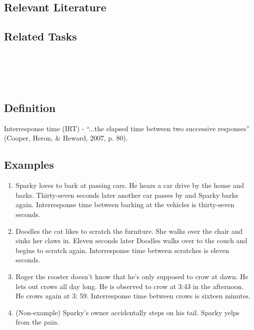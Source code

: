 \subsection{Relevant Literature}
\begin{refsection}
\nocite{cooper2007applied,thomason2011response}
\printbibliography[heading=none]
\end{refsection}

\subsection{Related Tasks}
\fourhOne{}\\
\fouriOne{}\\
\fourFKFourtySeven{}\\
%
\clearpage \section{\fouraFive{}}
\subsection{Definition}  
Interresponse time (IRT) - ``...the elapsed time between two successive responses'' (Cooper, Heron, \& Heward, 2007, p. 80).
%  
\subsection{Examples} 
\begin{enumerate}
\item Sparky loves to bark at passing cars.  He hears a car drive by the house and barks.  Thirty-seven seconds later another car passes by and Sparky barks again.  Interresponse time between barking at the vehicles is thirty-seven seconds.
\item Doodles the cat likes to scratch the furniture.  She walks over the chair and sinks her claws in.  Eleven seconds later Doodles walks over to the couch and begins to scratch again.  Interresponse time between scratches is eleven seconds.  
\item Roger the rooster doesn't know that he's only supposed to crow at dawn. He lets out crows all day long.  He is observed to crow at 3:43 in the afternoon.  He crows again at 3: 59.  Interresponse time between crows is sixteen minutes.  
\item (Non-example) Sparky's owner accidentally steps on his tail.  Sparky yelps from the pain. 
\end{enumerate}
%
